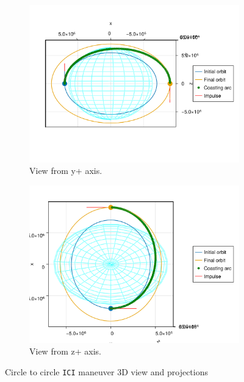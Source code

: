 \begin{figure}[htbp]
\begin{subfigure}{0.49\linewidth}
        \includegraphics[width=\linewidth]{../results/two_body/hohmann/ICI_y+.png}
        \caption{View from y+ axis.}
    \end{subfigure}
    \begin{subfigure}{0.49\linewidth}
        \includegraphics[width=\linewidth]{../results/two_body/hohmann/ICI_z+.png}
        \caption{View from z+ axis.}
    \end{subfigure}
    \caption{Circle to circle \texttt{ICI} maneuver 3D view and projections}
    \label{fig:tb_c2c_ICI_figs}
\end{figure}

